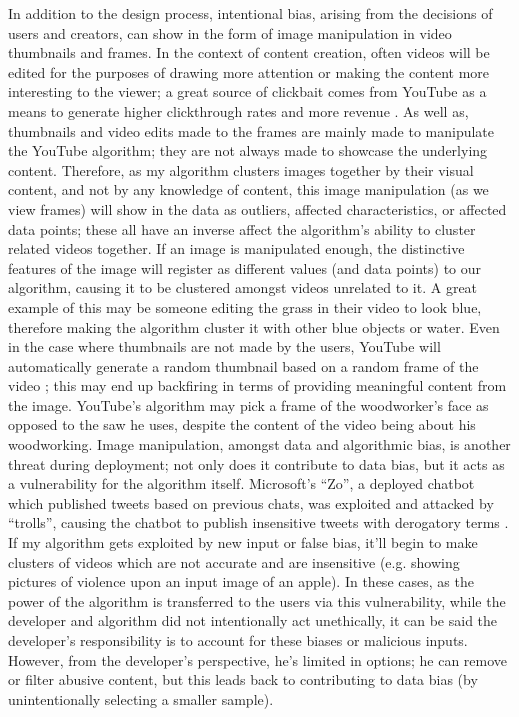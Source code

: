 \documentclass[10pt,twocolumn]{article}
\begin{document}
In addition to the design process, intentional bias, arising from the decisions of users and creators, can show in the form of image manipulation in video thumbnails and frames.	
In the context of content creation, often videos will be edited for the purposes of drawing more attention or making the content more interesting to the viewer; a great source of clickbait comes from YouTube as a means to generate higher clickthrough rates and more revenue \cite{Muller2021}. As well as, thumbnails and video edits made to the frames are mainly made to manipulate the YouTube algorithm; they are not always made to showcase the underlying content. Therefore, as my algorithm clusters images together by their visual content, and not by any knowledge of content, this image manipulation (as we view frames) will show in the data as outliers, affected characteristics, or affected data points; these all have an inverse affect the algorithm’s ability to cluster related videos together. If an image is manipulated enough, the distinctive features of the image will register as different values (and data points) to our algorithm, causing it to be clustered amongst videos unrelated to it. A great example of this may be someone editing the grass in their video to look blue, therefore making the algorithm cluster it with other blue objects or water. Even in the case where thumbnails are not made by the users, YouTube will automatically generate a random thumbnail based on a random frame of the video \cite{YTAddingThumbnails}; this may end up backfiring in terms of providing meaningful content from the image. YouTube’s algorithm may pick a frame of the woodworker’s face as opposed to the saw he uses, despite the content of the video being about his woodworking. Image manipulation, amongst data and algorithmic bias, is another threat during deployment; not only does it contribute to data bias, but it acts as a vulnerability for the algorithm itself. Microsoft’s “Zo”, a deployed chatbot which published tweets based on previous chats, was exploited and attacked by “trolls”, causing the chatbot to publish insensitive tweets with derogatory terms \cite{CrashCourseABias}. If my algorithm gets exploited by new input or false bias, it’ll begin to make clusters of videos which are not accurate and are insensitive (e.g. showing pictures of violence upon an input image of an apple). In these cases, as the power of the algorithm is transferred to the users via this vulnerability, while the developer and algorithm did not intentionally act unethically, it can be said the developer’s responsibility is to account for these biases or malicious inputs. However, from the developer’s perspective, he’s limited in options; he can remove or filter abusive content, but this leads back to contributing to data bias (by unintentionally selecting a smaller sample).
\end{document}
